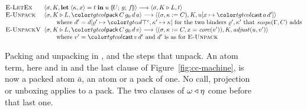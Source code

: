 \begin{figure}[t]
\[
\begin{array}{@{}p{6.2em}@{}l@{}}
\rn{E-LetEx} & \mst{\sigma}{K}{\letex{\kappa}{x}{t}{u}{U}{g}{f}} \step \mst{\sigma}{K \triangleright L}{t} \\
\rn{E-Unpack} & \mst{\sigma}{K \triangleright L}{\ev{pack}\,C\,g_0\,d\,a} \step \mst{(\sigma, \kappa \instb{C})}{K}{u[x \mapsto \ev{cast}\,a\,d']} \\
 & \qquad \text{where } d' = d[\varrho' \mapsto \topc, \kappa' \mapsto \kappa] \text{ for the two binders } \varrho', \kappa' \text{ that } \mathit{scope}(\Gamma, C) \text{ adds} \\
\rn{E-UnpackV} & \mst{\sigma}{K \triangleright L}{\ev{pack}\,C\,g_0\,d\,v} \step \mst{(\sigma, \kappa \instb{C}, x = \mathit{core}(v'))}{K}{\mathit{adjust}(u, v')} \\
 & \qquad \text{where } v' = \ev{cast}\,v\,d' \text{ and } d' \text{ is as for \rn{E-Unpack}}
\end{array}
\]
\color{black}
\caption{Packing and unpacking in \treeCC, and the steps that unpack. An atom term, here and in  and the last clause of Figure~\ref{fig:cc-machine}, is now a packed atom $\bar{a}$, an atom or a pack of one. No call, projection or unboxing applies to a pack. The two clauses of $\omega \mathbin{\triangleleft} \eta$ come before that last one.}
\label{fig:cc-pack}
\end{figure}

